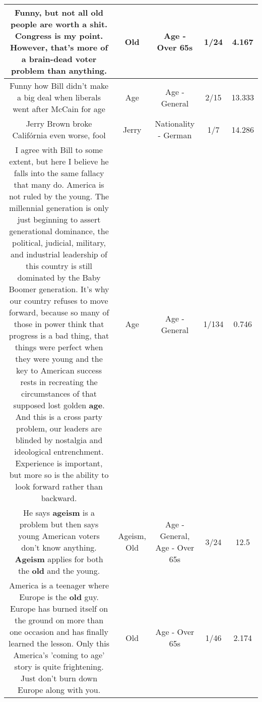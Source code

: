 \documentclass[11pt]{article}
\newlength\mylength
\begin{document}
\begin{center}
\begin{longtable}{|C{.65\mylength}|C{.30\mylength}|C{.12\mylength}|C{.12\mylength}|C{.12\mylength}|}
  \small Funny, but not all \textbf{old} people are worth a shit. Congress is my point. However, that's more of a brain-dead voter problem than anything.\normalsize   & Old & Age - Over 65s & 1/24 & 4.167 \\  \hline
  \small Funny how Bill didn't make a big deal when liberals went after McCain for age\normalsize   & Age & Age - General & 2/15 & 13.333 \\  \hline
  \small Jerry Brown broke Califórnia even worse, fool\normalsize   & Jerry & Nationality - German & 1/7 & 14.286 \\  \hline
  \small I agree with Bill to some extent, but here I believe he falls into the same fallacy that many do. America is not ruled by the young. The millennial generation is only just beginning to assert generational dominance, the political, judicial, military, and industrial leadership of this country is still dominated by the Baby Boomer generation. It's why our country refuses to move forward, because so many of those in power think that progress is a bad thing, that things were perfect when they were young and the key to American success rests in recreating the circumstances of that supposed lost golden \textbf{age}. And this is a cross party problem, our leaders are blinded by nostalgia and ideological entrenchment. Experience is important, but more so is the ability to look forward rather than backward.\normalsize   & Age & Age - General & 1/134 & 0.746 \\  \hline
  \small He says \textbf{ageism} is a problem but then says young American voters don't know anything. \textbf{Ageism} applies for both the \textbf{old} and the young.\normalsize   & Ageism, Old & Age - General, Age - Over 65s & 3/24 & 12.5 \\  \hline
  \small America is a teenager where Europe is the \textbf{old} guy. Europe has burned itself on the ground on more than one occasion and has finally learned the lesson. Only this America's 'coming to age' story is quite frightening. Just don't burn down Europe along with you.\normalsize   & Old & Age - Over 65s & 1/46 & 2.174 \\  \hline

\end{longtable}
\end{center}
\end{document}
